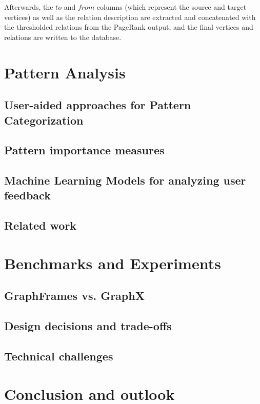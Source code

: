 \documentclass[
        a4paper,     %
        titlepage,   %
        oneside,     %
        parskip      %
        ]{scrartcl}  %
\begin{document}
  Afterwards, the $to$ and $from$ columns (which represent the source and target vertices)
  as well as the relation description are extracted and concatenated with the thresholded
  relations from the PageRank output, and the final vertices and relations are written
  to the database.
  \pagebreak

  \section{Pattern Analysis}
    \subsection{User-aided approaches for Pattern Categorization}
    \subsection{Pattern importance measures}
    \subsection{Machine Learning Models for analyzing user feedback}
    \subsection{Related work}
    \pagebreak

  \section{Benchmarks and Experiments}
    \subsection{GraphFrames vs. GraphX}
    \subsection{Design decisions and trade-offs}
    \subsection{Technical challenges}
    \pagebreak

  \section{Conclusion and outlook}

  \clearpage
  
\end{document}
